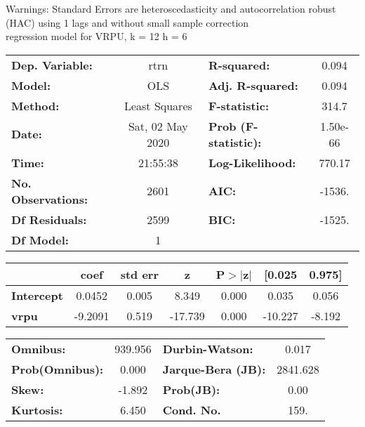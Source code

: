 Warnings: \newline
 [1] Standard Errors are heteroscedasticity and autocorrelation robust (HAC) using 1 lags and without small sample correction\\ 

regression model for VRPU, k = 12 h = 6\begin{center}
\begin{tabular}{lclc}
\toprule
\textbf{Dep. Variable:}    &       rtrn       & \textbf{  R-squared:         } &     0.094   \\
\textbf{Model:}            &       OLS        & \textbf{  Adj. R-squared:    } &     0.094   \\
\textbf{Method:}           &  Least Squares   & \textbf{  F-statistic:       } &     314.7   \\
\textbf{Date:}             & Sat, 02 May 2020 & \textbf{  Prob (F-statistic):} &  1.50e-66   \\
\textbf{Time:}             &     21:55:38     & \textbf{  Log-Likelihood:    } &    770.17   \\
\textbf{No. Observations:} &        2601      & \textbf{  AIC:               } &    -1536.   \\
\textbf{Df Residuals:}     &        2599      & \textbf{  BIC:               } &    -1525.   \\
\textbf{Df Model:}         &           1      & \textbf{                     } &             \\
\bottomrule
\end{tabular}
\begin{tabular}{lcccccc}
                   & \textbf{coef} & \textbf{std err} & \textbf{z} & \textbf{P$> |$z$|$} & \textbf{[0.025} & \textbf{0.975]}  \\
\midrule
\textbf{Intercept} &       0.0452  &        0.005     &     8.349  &         0.000        &        0.035    &        0.056     \\
\textbf{vrpu}      &      -9.2091  &        0.519     &   -17.739  &         0.000        &      -10.227    &       -8.192     \\
\bottomrule
\end{tabular}
\begin{tabular}{lclc}
\textbf{Omnibus:}       & 939.956 & \textbf{  Durbin-Watson:     } &    0.017  \\
\textbf{Prob(Omnibus):} &   0.000 & \textbf{  Jarque-Bera (JB):  } & 2841.628  \\
\textbf{Skew:}          &  -1.892 & \textbf{  Prob(JB):          } &     0.00  \\
\textbf{Kurtosis:}      &   6.450 & \textbf{  Cond. No.          } &     159.  \\
\bottomrule
\end{tabular}
\end{center}

